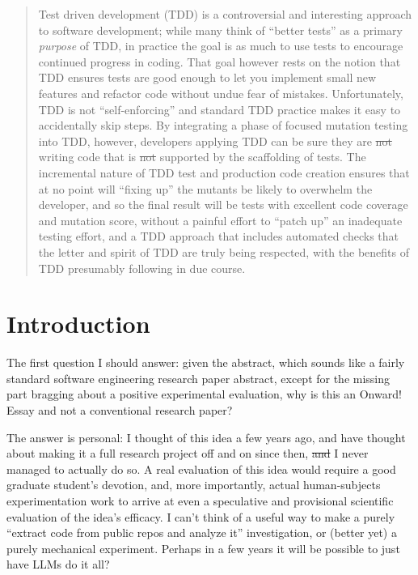 \documentclass[sigplan,screen]{acmart}
\providecommand{\DIFadd}[1]{{\protect\color{blue}\uwave{#1}}} %
\providecommand{\DIFdel}[1]{{\protect\color{red}\sout{#1}}}                      %
\providecommand{\DIFaddbegin}{} %
\providecommand{\DIFaddend}{} %
\providecommand{\DIFdelbegin}{} %
\providecommand{\DIFdelend}{} %
\newcommand{\DIFscaledelfig}{0.5}
\newlength{\DIFdelgraphicswidth} %
\newlength{\DIFdelgraphicsheight} %
\newcommand{\DIFaddincludegraphics}[2][]{{\color{blue}\fbox{\DIFOincludegraphics[#1]{#2}}}} %
\newcommand{\DIFdelincludegraphics}[2][]{%
\sbox{\DIFdelgraphicsbox}{\DIFOincludegraphics[#1]{#2}}%
\settoboxwidth{\DIFdelgraphicswidth}{\DIFdelgraphicsbox} %
\settoboxtotalheight{\DIFdelgraphicsheight}{\DIFdelgraphicsbox} %
\scalebox{\DIFscaledelfig}{%
\parbox[b]{\DIFdelgraphicswidth}{\usebox{\DIFdelgraphicsbox}\\[-\baselineskip] \rule{\DIFdelgraphicswidth}{0em}}\llap{\resizebox{\DIFdelgraphicswidth}{\DIFdelgraphicsheight}{%
\setlength{\unitlength}{\DIFdelgraphicswidth}%
\begin{picture}(1,1)%
\thicklines\linethickness{2pt} %
{\color[rgb]{1,0,0}\put(0,0){\framebox(1,1){}}}%
{\color[rgb]{1,0,0}\put(0,0){\line( 1,1){1}}}%
{\color[rgb]{1,0,0}\put(0,1){\line(1,-1){1}}}%
\end{picture}%
}\hspace*{3pt}}} %
} %
\DeclareRobustCommand{\DIFaddbegin}{\DIFOaddbegin \let\includegraphics\DIFaddincludegraphics} %
\DeclareRobustCommand{\DIFaddend}{\DIFOaddend \let\includegraphics\DIFOincludegraphics} %
\DeclareRobustCommand{\DIFdelbegin}{\DIFOdelbegin \let\includegraphics\DIFdelincludegraphics} %
\DeclareRobustCommand{\DIFdelend}{\DIFOaddend \let\includegraphics\DIFOincludegraphics} %
\begin{document}
\begin{abstract}
Test driven development (TDD) is a controversial and interesting approach to
software development; while many think of ``better tests'' as a
primary \emph{purpose} of TDD, in practice the goal is as much to use
tests to encourage continued progress in coding.   That goal however
rests on the notion that TDD ensures tests are good enough to let you
implement small new features and refactor code without undue fear of
mistakes.  Unfortunately, TDD is not ``self-enforcing'' and standard
TDD practice makes it easy to accidentally skip steps.  By integrating
a phase of focused mutation testing into TDD, however, developers
applying TDD can be sure they are \DIFdelbegin \DIFdel{not }\DIFdelend \DIFaddbegin \DIFadd{actually }\DIFaddend writing code that is
\DIFdelbegin \DIFdel{not
}\DIFdelend supported by the scaffolding of tests\DIFaddbegin \DIFadd{, and so code in justified confidence}\DIFaddend .  The incremental nature of TDD
test and production code creation ensures that at no point will
``fixing up'' the mutants be likely to overwhelm the developer, and so
the final result will be tests with excellent code coverage and
mutation score, without a painful effort to ``patch up'' an inadequate
testing effort, and a TDD approach that includes automated checks that
the letter and spirit of TDD are truly being respected, with the
benefits of TDD presumably following in due course.
  \end{abstract}



\maketitle


\section{Introduction}

The first question I should answer: given the abstract, which sounds
like a fairly standard software engineering research paper abstract,
except for the missing part bragging
about a positive experimental evaluation, why is this an Onward! Essay
and not a conventional research paper?

The answer is personal:  I thought of this idea a few years ago, and
have thought about making it a full research project off and on since
then, \DIFdelbegin \DIFdel{and }\DIFdelend \DIFaddbegin \DIFadd{but }\DIFaddend I
never managed to actually do so.  A real evaluation of this idea would
require a good graduate student's devotion, and, more importantly,
actual human-subjects experimentation work to arrive at even a
speculative and provisional scientific evaluation of the idea's
efficacy.  I can't think of a useful way to make a purely ``extract
code from public repos and analyze it'' investigation, or (better yet)
a purely mechanical experiment.  Perhaps in a few years it will be
possible to just have LLMs do it all?
\end{document}
